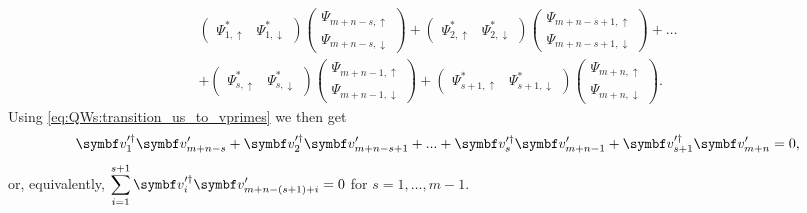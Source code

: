 \begin{equation}
\begin{aligned}
	\begin{pmatrix}
		\Psi_{1, \uparrow}^* & \Psi_{1, \downarrow}^*
	\end{pmatrix}
	\begin{pmatrix}
		\Psi_{m+n-s, \uparrow} \\ \Psi_{m+n-s, \downarrow}
	\end{pmatrix}
	+
	\begin{pmatrix}
		\Psi_{2, \uparrow}^* & \Psi_{2, \downarrow}^*
	\end{pmatrix}
	\begin{pmatrix}
		\Psi_{m+n-s+1, \uparrow} \\ \Psi_{m+n-s+1, \downarrow}
	\end{pmatrix} + \dots\\
	+ 
	\begin{pmatrix}
		\Psi_{s, \uparrow}^* & \Psi_{s, \downarrow}^*
	\end{pmatrix}
	\begin{pmatrix}
		\Psi_{m+n-1, \uparrow} \\ \Psi_{m+n-1, \downarrow}
	\end{pmatrix}
	+
	\begin{pmatrix}
		\Psi_{s+1, \uparrow}^* & \Psi_{s+1, \downarrow}^*
	\end{pmatrix}
	\begin{pmatrix}
		\Psi_{m+n, \uparrow} \\ \Psi_{m+n, \downarrow}
	\end{pmatrix}.
\end{aligned}
\end{equation}
Using \cref{eq:QWs:transition_us_to_vprimes} we then get
\begin{equation}
	\bs v^{\prime\dagger}_1 \bs v^\prime_{m+n-s} +
	\bs v^{\prime\dagger}_2 \bs v^\prime_{m+n-s+1} +
	... +
    \bs v^{\prime\dagger}_{s} \bs v^\prime_{m+n-1} +
	\bs v^{\prime\dagger}_{s+1} \bs v^\prime_{m+n} = 0,
\end{equation}
or, equivalently,
$\displaystyle \sum_{i=1}^{s+1} \bs v^{\prime\dagger}_i \bs v^\prime_{m+n-(s+1)+i}=0$
for $s=1,\dots,m-1$.

